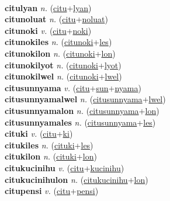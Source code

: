  \label{citulonsomalon} \\
\textbf{citulyan} \textit{n.} (\hyperref[citu]{citu}+\hyperref[lyan]{lyan})
 \label{citulyan} \\
\textbf{citunoluat} \textit{n.} (\hyperref[citu]{citu}+\hyperref[noluat]{noluat})
 \label{citunoluat} \\
\textbf{citunoki} \textit{v.} (\hyperref[citu]{citu}+\hyperref[noki]{noki})
 \label{citunoki} \\
\textbf{citunokiles} \textit{n.} (\hyperref[citunoki]{citunoki}+\hyperref[les]{les})
 \label{citunokiles} \\
\textbf{citunokilon} \textit{n.} (\hyperref[citunoki]{citunoki}+\hyperref[lon]{lon})
 \label{citunokilon} \\
\textbf{citunokilyot} \textit{n.} (\hyperref[citunoki]{citunoki}+\hyperref[lyot]{lyot})
 \label{citunokilyot} \\
\textbf{citunokilwel} \textit{n.} (\hyperref[citunoki]{citunoki}+\hyperref[lwel]{lwel})
 \label{citunokilwel} \\
\textbf{citusunnyama} \textit{v.} (\hyperref[citu]{citu}+\hyperref[sun]{sun}+\hyperref[nyama]{nyama})
 \label{citusunnyama} \\
\textbf{citusunnyamalwel} \textit{n.} (\hyperref[citusunnyama]{citusunnyama}+\hyperref[lwel]{lwel})
 \label{citusunnyamalwel} \\
\textbf{citusunnyamalon} \textit{n.} (\hyperref[citusunnyama]{citusunnyama}+\hyperref[lon]{lon})
 \label{citusunnyamalon} \\
\textbf{citusunnyamales} \textit{n.} (\hyperref[citusunnyama]{citusunnyama}+\hyperref[les]{les})
 \label{citusunnyamales} \\
\textbf{cituki} \textit{v.} (\hyperref[citu]{citu}+\hyperref[ki]{ki})
 \label{cituki} \\
\textbf{citukiles} \textit{n.} (\hyperref[cituki]{cituki}+\hyperref[les]{les})
 \label{citukiles} \\
\textbf{citukilon} \textit{n.} (\hyperref[cituki]{cituki}+\hyperref[lon]{lon})
 \label{citukilon} \\
\textbf{citukucinihu} \textit{v.} (\hyperref[citu]{citu}+\hyperref[kucinihu]{kucinihu})
 \label{citukucinihu} \\
\textbf{citukucinihulon} \textit{n.} (\hyperref[citukucinihu]{citukucinihu}+\hyperref[lon]{lon})
 \label{citukucinihulon} \\
\textbf{citupensi} \textit{v.} (\hyperref[citu]{citu}+\hyperref[pensi]{pensi})
 \label{citupensi} \\
